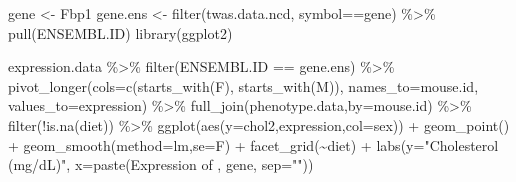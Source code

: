 \documentclass[
]{article}
\newenvironment{Shaded}{\begin{snugshade}}{\end{snugshade}}
\newcommand{\AttributeTok}[1]{\textcolor[rgb]{0.77,0.63,0.00}{#1}}
\newcommand{\FunctionTok}[1]{\textcolor[rgb]{0.00,0.00,0.00}{#1}}
\newcommand{\NormalTok}[1]{#1}
\newcommand{\OtherTok}[1]{\textcolor[rgb]{0.56,0.35,0.01}{#1}}
\newcommand{\SpecialCharTok}[1]{\textcolor[rgb]{0.00,0.00,0.00}{#1}}
\newcommand{\StringTok}[1]{\textcolor[rgb]{0.31,0.60,0.02}{#1}}
\begin{document}
\begin{Shaded}
\begin{Highlighting}[]
\NormalTok{gene }\OtherTok{\textless{}{-}} \StringTok{\textquotesingle{}Fbp1\textquotesingle{}}
\NormalTok{gene.ens }\OtherTok{\textless{}{-}} \FunctionTok{filter}\NormalTok{(twas.data.ncd, symbol}\SpecialCharTok{==}\NormalTok{gene) }\SpecialCharTok{\%\textgreater{}\%} \FunctionTok{pull}\NormalTok{(ENSEMBL.ID)}
\FunctionTok{library}\NormalTok{(ggplot2)}

\NormalTok{expression.data }\SpecialCharTok{\%\textgreater{}\%}
  \FunctionTok{filter}\NormalTok{(ENSEMBL.ID }\SpecialCharTok{==}\NormalTok{ gene.ens) }\SpecialCharTok{\%\textgreater{}\%}
  \FunctionTok{pivot\_longer}\NormalTok{(}\AttributeTok{cols=}\FunctionTok{c}\NormalTok{(}\FunctionTok{starts\_with}\NormalTok{(}\StringTok{\textquotesingle{}F\textquotesingle{}}\NormalTok{),}
                      \FunctionTok{starts\_with}\NormalTok{(}\StringTok{\textquotesingle{}M\textquotesingle{}}\NormalTok{)),}
               \AttributeTok{names\_to=}\StringTok{\textquotesingle{}mouse.id\textquotesingle{}}\NormalTok{,}
               \AttributeTok{values\_to=}\StringTok{\textquotesingle{}expression\textquotesingle{}}\NormalTok{) }\SpecialCharTok{\%\textgreater{}\%}
  \FunctionTok{full\_join}\NormalTok{(phenotype.data,}\AttributeTok{by=}\StringTok{\textquotesingle{}mouse.id\textquotesingle{}}\NormalTok{) }\SpecialCharTok{\%\textgreater{}\%}
  \FunctionTok{filter}\NormalTok{(}\SpecialCharTok{!}\FunctionTok{is.na}\NormalTok{(diet)) }\SpecialCharTok{\%\textgreater{}\%}
  \FunctionTok{ggplot}\NormalTok{(}\FunctionTok{aes}\NormalTok{(}\AttributeTok{y=}\NormalTok{chol2,expression,}\AttributeTok{col=}\NormalTok{sex)) }\SpecialCharTok{+}
  \FunctionTok{geom\_point}\NormalTok{() }\SpecialCharTok{+}
  \FunctionTok{geom\_smooth}\NormalTok{(}\AttributeTok{method=}\StringTok{\textquotesingle{}lm\textquotesingle{}}\NormalTok{,}\AttributeTok{se=}\NormalTok{F) }\SpecialCharTok{+}
  \FunctionTok{facet\_grid}\NormalTok{(}\SpecialCharTok{\textasciitilde{}}\NormalTok{diet) }\SpecialCharTok{+}
  \FunctionTok{labs}\NormalTok{(}\AttributeTok{y=}\StringTok{"Cholesterol (mg/dL)"}\NormalTok{,}
       \AttributeTok{x=}\FunctionTok{paste}\NormalTok{(}\StringTok{\textquotesingle{}Expression of \textquotesingle{}}\NormalTok{, gene, }\AttributeTok{sep=}\StringTok{""}\NormalTok{))}
\end{Highlighting}
\end{Shaded}
\end{document}
